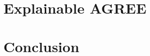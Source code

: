 \documentclass[conference]{IEEEtran}
\begin{document}
\section{Explainable AGREE}
\label{sec:agree}


%

\section{Conclusion}
\label{sec:conclusion}





\end{document}
